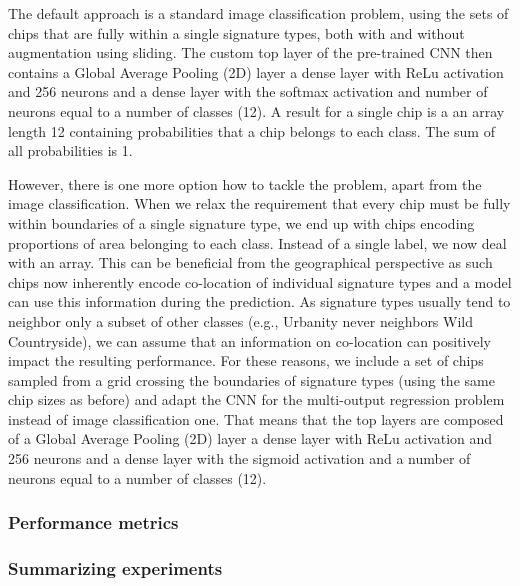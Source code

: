 
The default approach is a standard image classification problem, using the sets of chips
that are fully within a single signature types, both with and without augmentation using
sliding. The custom top layer of the pre-trained CNN then contains a Global Average
Pooling (2D) layer a dense layer with ReLu activation and 256 neurons and a dense layer
with the softmax activation and number of neurons equal to a number of classes (12). A
result for a single chip is a an array length 12 containing probabilities that a chip
belongs to each class. The sum of all probabilities is 1.


However, there is one more option how to tackle the problem, apart from the image
classification. When we relax the requirement that every chip must be fully within
boundaries of a single signature type, we end up with chips encoding proportions of area
belonging to each class. Instead of a single label, we now deal with an array. This can
be beneficial from the geographical perspective as such chips now inherently encode
co-location of individual signature types and a model can use this information during
the prediction. As signature types usually tend to neighbor only a subset of other
classes (e.g., Urbanity never neighbors Wild Countryside), we can assume that an
information on co-location can positively impact the resulting performance. For these
reasons, we include a set of chips sampled from a grid crossing the boundaries of
signature types (using the same chip sizes as before) and adapt the CNN for the
multi-output regression problem instead of image classification one. That means that the
top layers are composed of a Global Average Pooling (2D) layer a dense layer with ReLu
activation and 256 neurons and a dense layer with the sigmoid activation and a number of
neurons equal to a number of classes (12).


\subsubsection{Performance metrics}




\subsubsection{Summarizing experiments}


